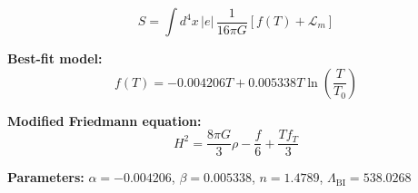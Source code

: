 
\begin{equation}
  S = \int d^4x \, |e| \, \frac{1}{16\pi G} \left[ f(T) + \mathcal{L}_m \right]
\end{equation}

\textbf{Best-fit model:}
\begin{equation}
  f(T) = -0.004206 T + 0.005338 T \ln\!\left(\frac{T}{T_0}\right)
\end{equation}

\textbf{Modified Friedmann equation:}
\begin{equation}
  H^2 = \frac{8\pi G}{3} \rho - \frac{f}{6} + \frac{T f_T}{3}
\end{equation}

\textbf{Parameters:}
$\alpha = -0.004206$, \quad
$\beta = 0.005338$, \quad
$n = 1.4789$, \quad
$\Lambda_{\text{BI}} = 538.0268$